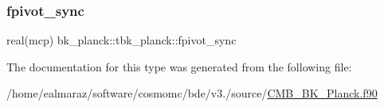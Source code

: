 \mbox{\label{structbk__planck_1_1tbk__planck_a55f8ea8aa72e41f98b69a51495554454}} 
\subsubsection{\texorpdfstring{fpivot\+\_\+sync}{fpivot\_sync}}
{\footnotesize\ttfamily real(mcp) bk\+\_\+planck\+::tbk\+\_\+planck\+::fpivot\+\_\+sync\hspace{0.3cm}{\ttfamily [private]}}



The documentation for this type was generated from the following file\+:\begin{DoxyCompactItemize}
\item 
/home/ealmaraz/software/cosmomc/bde/v3./source/\mbox{\hyperlink{CMB__BK__Planck_8f90}{C\+M\+B\+\_\+\+B\+K\+\_\+\+Planck.\+f90}}\end{DoxyCompactItemize}
